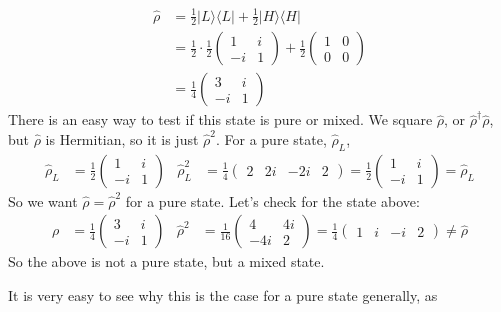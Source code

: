 \documentclass[a4paper, 11pt, normalem]{report}
\newcommand\hrho{\hat{\rho}}
\begin{document}
\begin{example}
    \begin{align}
        \hrho &= \frac12 |L\rangle\langle L| + \frac12|H\rangle\langle H| \\
              &= \frac12\cdot\frac12\begin{pmatrix}1 & i \\ -i & 1\end{pmatrix} + \frac12\begin{pmatrix} 1 & 0 \\ 0 & 0 \end{pmatrix} \\
              &= \frac14 \begin{pmatrix} 3 & i \\ -i & 1\end{pmatrix}
    \end{align}
    There is an easy way to test if this state is pure or mixed. 
    We square $\hrho$, or $\hrho^\dagger\hrho$, but $\hrho$ is Hermitian, so it is just $\hrho^2$.
    For a pure state, $\hrho_L$,
    \begin{align}
        \hrho_L &= \frac12\begin{pmatrix} 1 & i \\ -i & 1\end{pmatrix} & \hrho_L^2 &= \frac14\begin{pmatrix} 2 & 2i & -2i & 2\end{pmatrix} = \frac12\begin{pmatrix}1 & i \\ -i & 1 \end{pmatrix} = \hrho_L 
    \end{align}
    So we want $\hrho = \hrho^2$ for a pure state. 
    Let's check for the state above:
    \begin{align}
        \rho &= \frac14\begin{pmatrix}3 & i \\ -i & 1\end{pmatrix} & \hrho^2 &= \frac{1}{16}\begin{pmatrix}4 & 4i \\ -4i & 2\end{pmatrix} = \frac14\begin{pmatrix}1 & i & -i & 2\end{pmatrix} \neq \hrho
    \end{align}
    So the above is not a pure state, but a mixed state.
\end{example}
It is very easy to see why this is the case for a pure state generally, as
\end{document}
